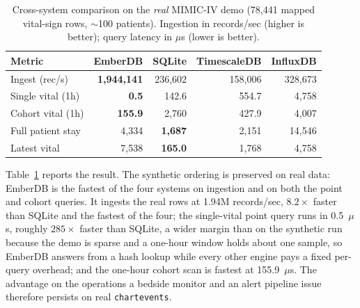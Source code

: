 \documentclass[journal]{IEEEtran}
\begin{document}
\begin{table}[htbp]
\centering
\caption{Cross-system comparison on the \emph{real} MIMIC-IV demo (78{,}441 mapped vital-sign rows, $\sim$100 patients). Ingestion in records/sec (higher is better); query latency in $\mu$s (lower is better).}
\label{tab:realdemo}
\setlength{\tabcolsep}{4pt}
\begin{tabular}{lrrrr}
\toprule
\textbf{Metric} & \textbf{EmberDB} & \textbf{SQLite} & \textbf{TimescaleDB} & \textbf{InfluxDB} \\
\midrule
Ingest (rec/s) & \textbf{1{,}944{,}141} & 236{,}602 & 158{,}006 & 328{,}673 \\
\midrule
Single vital (1h) & \textbf{0.5} & 142.6 & 554.7 & 4{,}758 \\
Cohort vital (1h) & \textbf{155.9} & 2{,}760 & 427.9 & 4{,}007 \\
Full patient stay & 4{,}334 & \textbf{1{,}687} & 2{,}151 & 14{,}546 \\
Latest vital & 7{,}538 & \textbf{165.0} & 1{,}768 & 4{,}758 \\
\bottomrule
\end{tabular}
\end{table}

Table~\ref{tab:realdemo} reports the result. The synthetic ordering is preserved on real data: EmberDB is the fastest of the four systems on ingestion and on both the point and cohort queries. It ingests the real rows at 1.94M records/sec, $8.2\times$ faster than SQLite and the fastest of the four; the single-vital point query runs in 0.5~$\mu$s, roughly $285\times$ faster than SQLite, a wider margin than on the synthetic run because the demo is sparse and a one-hour window holds about one sample, so EmberDB answers from a hash lookup while every other engine pays a fixed per-query overhead; and the one-hour cohort scan is fastest at 155.9~$\mu$s. The advantage on the operations a bedside monitor and an alert pipeline issue therefore persists on real \texttt{chartevents}.
\end{document}
